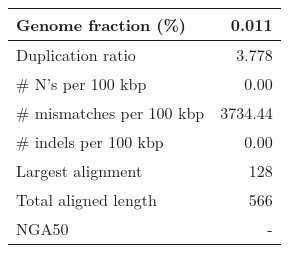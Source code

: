 \documentclass[12pt,a4paper]{article}
\begin{document}
\begin{table}[ht]
\begin{center}
\begin{tabular}{|l*{1}{|r}|}
Genome fraction (\%) & 0.011 \\ \hline
Duplication ratio & 3.778 \\ \hline
\# N's per 100 kbp & 0.00 \\ \hline
\# mismatches per 100 kbp & 3734.44 \\ \hline
\# indels per 100 kbp & 0.00 \\ \hline
Largest alignment & 128 \\ \hline
Total aligned length & 566 \\ \hline
NGA50 & - \\ \hline
\end{tabular}
\end{center}
\end{table}
\end{document}
